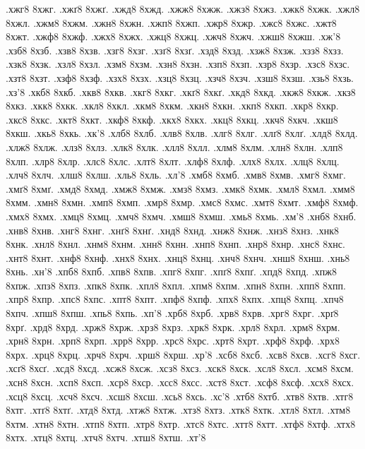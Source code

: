{.хжг8
8хжг.
.хжґ8
8хжґ.
.хжд8
8хжд.
.хжж8
8хжж.
.хжз8
8хжз.
.хжк8
8хжк.
.хжл8
8хжл.
.хжм8
8хжм.
.хжн8
8хжн.
.хжп8
8хжп.
.хжр8
8хжр.
.хжс8
8хжс.
.хжт8
8хжт.
.хжф8
8хжф.
.хжх8
8хжх.
.хжц8
8хжц.
.хжч8
8хжч.
.хжш8
8хжш.
.хж'8
.хзб8
8хзб.
.хзв8
8хзв.
.хзг8
8хзг.
.хзґ8
8хзґ.
.хзд8
8хзд.
.хзж8
8хзж.
.хзз8
8хзз.
.хзк8
8хзк.
.хзл8
8хзл.
.хзм8
8хзм.
.хзн8
8хзн.
.хзп8
8хзп.
.хзр8
8хзр.
.хзс8
8хзс.
.хзт8
8хзт.
.хзф8
8хзф.
.хзх8
8хзх.
.хзц8
8хзц.
.хзч8
8хзч.
.хзш8
8хзш.
.хзь8
8хзь.
.хз'8
.хкб8
8хкб.
.хкв8
8хкв.
.хкг8
8хкг.
.хкґ8
8хкґ.
.хкд8
8хкд.
.хкж8
8хкж.
.хкз8
8хкз.
.хкк8
8хкк.
.хкл8
8хкл.
.хкм8
8хкм.
.хкн8
8хкн.
.хкп8
8хкп.
.хкр8
8хкр.
.хкс8
8хкс.
.хкт8
8хкт.
.хкф8
8хкф.
.хкх8
8хкх.
.хкц8
8хкц.
.хкч8
8хкч.
.хкш8
8хкш.
.хкь8
8хкь.
.хк'8
.хлб8
8хлб.
.хлв8
8хлв.
.хлг8
8хлг.
.хлґ8
8хлґ.
.хлд8
8хлд.
.хлж8
8хлж.
.хлз8
8хлз.
.хлк8
8хлк.
.хлл8
8хлл.
.хлм8
8хлм.
.хлн8
8хлн.
.хлп8
8хлп.
.хлр8
8хлр.
.хлс8
8хлс.
.хлт8
8хлт.
.хлф8
8хлф.
.хлх8
8хлх.
.хлц8
8хлц.
.хлч8
8хлч.
.хлш8
8хлш.
.хль8
8хль.
.хл'8
.хмб8
8хмб.
.хмв8
8хмв.
.хмг8
8хмг.
.хмґ8
8хмґ.
.хмд8
8хмд.
.хмж8
8хмж.
.хмз8
8хмз.
.хмк8
8хмк.
.хмл8
8хмл.
.хмм8
8хмм.
.хмн8
8хмн.
.хмп8
8хмп.
.хмр8
8хмр.
.хмс8
8хмс.
.хмт8
8хмт.
.хмф8
8хмф.
.хмх8
8хмх.
.хмц8
8хмц.
.хмч8
8хмч.
.хмш8
8хмш.
.хмь8
8хмь.
.хм'8
.хнб8
8хнб.
.хнв8
8хнв.
.хнг8
8хнг.
.хнґ8
8хнґ.
.хнд8
8хнд.
.хнж8
8хнж.
.хнз8
8хнз.
.хнк8
8хнк.
.хнл8
8хнл.
.хнм8
8хнм.
.хнн8
8хнн.
.хнп8
8хнп.
.хнр8
8хнр.
.хнс8
8хнс.
.хнт8
8хнт.
.хнф8
8хнф.
.хнх8
8хнх.
.хнц8
8хнц.
.хнч8
8хнч.
.хнш8
8хнш.
.хнь8
8хнь.
.хн'8
.хпб8
8хпб.
.хпв8
8хпв.
.хпг8
8хпг.
.хпґ8
8хпґ.
.хпд8
8хпд.
.хпж8
8хпж.
.хпз8
8хпз.
.хпк8
8хпк.
.хпл8
8хпл.
.хпм8
8хпм.
.хпн8
8хпн.
.хпп8
8хпп.
.хпр8
8хпр.
.хпс8
8хпс.
.хпт8
8хпт.
.хпф8
8хпф.
.хпх8
8хпх.
.хпц8
8хпц.
.хпч8
8хпч.
.хпш8
8хпш.
.хпь8
8хпь.
.хп'8
.хрб8
8хрб.
.хрв8
8хрв.
.хрг8
8хрг.
.хрґ8
8хрґ.
.хрд8
8хрд.
.хрж8
8хрж.
.хрз8
8хрз.
.хрк8
8хрк.
.хрл8
8хрл.
.хрм8
8хрм.
.хрн8
8хрн.
.хрп8
8хрп.
.хрр8
8хрр.
.хрс8
8хрс.
.хрт8
8хрт.
.хрф8
8хрф.
.хрх8
8хрх.
.хрц8
8хрц.
.хрч8
8хрч.
.хрш8
8хрш.
.хр'8
.хсб8
8хсб.
.хсв8
8хсв.
.хсг8
8хсг.
.хсґ8
8хсґ.
.хсд8
8хсд.
.хсж8
8хсж.
.хсз8
8хсз.
.хск8
8хск.
.хсл8
8хсл.
.хсм8
8хсм.
.хсн8
8хсн.
.хсп8
8хсп.
.хср8
8хср.
.хсс8
8хсс.
.хст8
8хст.
.хсф8
8хсф.
.хсх8
8хсх.
.хсц8
8хсц.
.хсч8
8хсч.
.хсш8
8хсш.
.хсь8
8хсь.
.хс'8
.хтб8
8хтб.
.хтв8
8хтв.
.хтг8
8хтг.
.хтґ8
8хтґ.
.хтд8
8хтд.
.хтж8
8хтж.
.хтз8
8хтз.
.хтк8
8хтк.
.хтл8
8хтл.
.хтм8
8хтм.
.хтн8
8хтн.
.хтп8
8хтп.
.хтр8
8хтр.
.хтс8
8хтс.
.хтт8
8хтт.
.хтф8
8хтф.
.хтх8
8хтх.
.хтц8
8хтц.
.хтч8
8хтч.
.хтш8
8хтш.
.хт'8
}
